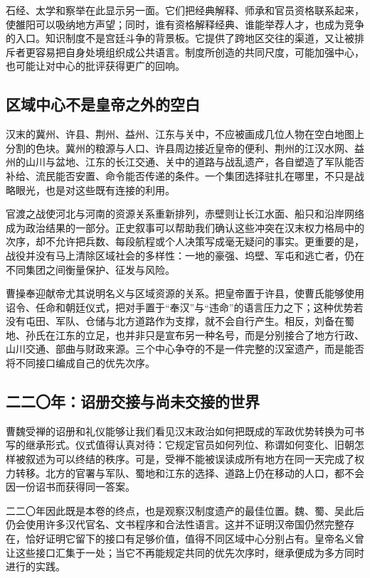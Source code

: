 石经、太学和察举在此显示另一面。它们把经典解释、师承和官员资格联系起来，使雒阳可以吸纳地方声望；同时，谁有资格解释经典、谁能举荐人才，也成为竞争的入口。知识制度不是宫廷斗争的背景板。它提供了跨地区交往的渠道，又让被排斥者更容易把自身处境组织成公共语言。制度所创造的共同尺度，可能加强中心，也可能让对中心的批评获得更广的回响。

\subsection{区域中心不是皇帝之外的空白}

汉末的冀州、许县、荆州、益州、江东与关中，不应被画成几位人物在空白地图上分割的色块。冀州的粮源与人口、许县周边接近皇帝的便利、荆州的江汉水网、益州的山川与盆地、江东的长江交通、关中的道路与战乱遗产，各自塑造了军队能否补给、流民能否安置、命令能否传递的条件。一个集团选择驻扎在哪里，不只是战略眼光，也是对这些既有连接的利用。

官渡之战使河北与河南的资源关系重新排列，赤壁则让长江水面、船只和沿岸网络成为政治结果的一部分。正史叙事可以帮助我们确认这些冲突在汉末权力格局中的次序，却不允许把兵数、每段航程或个人决策写成毫无疑问的事实。更重要的是，战役并没有马上清除区域社会的多样性：一地的豪强、坞壁、军屯和逃亡者，仍在不同集团之间衡量保护、征发与风险。

曹操奉迎献帝尤其说明名义与区域资源的关系。把皇帝置于许县，使曹氏能够使用诏令、任命和朝廷仪式，把对手置于“奉汉”与“违命”的语言压力之下；这种优势若没有屯田、军队、仓储与北方道路作为支撑，就不会自行产生。相反，刘备在蜀地、孙氏在江东的立足，也并非只是宣布另一种名号，而是分别接合了地方行政、山川交通、部曲与财政来源。三个中心争夺的不是一件完整的汉室遗产，而是能否将不同接口编成自己的优先次序。

\subsection{二二〇年：诏册交接与尚未交接的世界}

曹魏受禅的诏册和礼仪能够让我们看见汉末政治如何把既成的军政优势转换为可书写的继承形式。仪式值得认真对待：它规定官员如何列位、称谓如何变化、旧朝怎样被叙述为可以终结的秩序。可是，受禅不能被误读成所有地方在同一天完成了权力转移。北方的官署与军队、蜀地和江东的选择、道路上仍在移动的人口，都不会因一份诏书而获得同一答案。

二二〇年因此既是本卷的终点，也是观察汉制度遗产的最佳位置。魏、蜀、吴此后仍会使用许多汉代官名、文书程序和合法性语言。这并不证明汉帝国仍然完整存在，恰好证明它留下的接口有足够价值，值得不同区域中心分别占有。皇帝名义曾让这些接口汇集于一处；当它不再能规定共同的优先次序时，继承便成为多方同时进行的实践。

